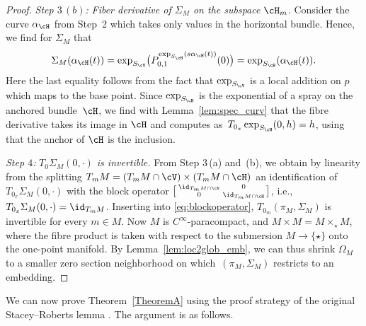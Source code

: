 \begin{proof}
{\it Step $3\,(b)$:} \emph{Fiber derivative of $\Sigma_M$ on the subspace $\cH_m$.} Consider the curve $\alpha_\cH$ from Step~2 which takes only values in the horizontal bundle. Hence, we find for $\Sigma_M$ that
\begin{displaymath}\Sigma_M (\alpha_{\cH}(t)) =\exp_{S_{\cV}}\bigl(P_{0,1}^{\exp_{S_\cH}(s\alpha_{\cH}(t))}(0)\bigr)=\exp_{S_\cH}(\alpha_\cH(t)).
\end{displaymath}
Here the last equality follows from the fact that $\exp_{S_{\cV}}$ is a local addition on $p$ which maps  to the base point. Since $\exp_{S_\cH}$ is the exponential of a spray on the anchored bundle~$\cH$, we find with Lemma~\ref{lem:spec_curv} that the fibre derivative takes its image in $\cH$ and computes as~$T_{0_x} \exp_{S_{\cH}}(0,h)=h$, using that the anchor of $\cH$ is the inclusion.

{\it Step $4$:} \emph{$T_0\Sigma_M(0,\cdot)$ is invertible.} From Step 3\,(a) and~(b), we obtain by linearity from the splitting $T_m M = (T_m M \cap \cV) \times (T_mM \cap \cH)$ an identification of $T_{0_x}\Sigma_M (0,\cdot )$ with the block operator
$\bigl[\begin{smallmatrix} \id_{T_m M \cap \cV} & 0 \\ 0 & \id_{T_mM \cap \cH}\end{smallmatrix}\bigr]$, i.e., $T_{0_x}\Sigma_M (0,\cdot ) = \id_{T_m M}$. Inserting into \eqref{eq:blockoperator}, $T_{0_m} (\pi_M,\Sigma_M)$ is invertible for every $m \in M$. Now $M$ is $C^\infty$-paracompact, and $M \times M = M \times_\star M$, where the fibre product is taken with respect to the submersion $M \rightarrow \{\star\}$ onto the one-point manifold. By Lemma~\ref{lem:loc2glob_emb}, we can thus shrink $\Omega_M$ to a smaller zero section neighborhood on which~$(\pi_M,\Sigma_M)$ restricts to an embedding.
\end{proof}

We can now prove Theorem~\ref{TheoremA} using the proof strategy of the original Stacey--Roberts lemma \cite[Lemma~2.4]{AaS19}. The argument is as follows.

